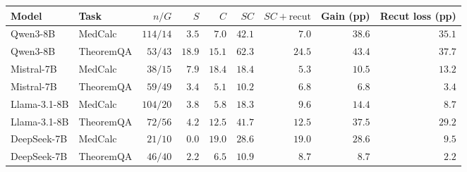 \begin{tabular*}{\textwidth}{@{\extracolsep{\fill}}llrrrrrrr@{}}
\toprule
Model & Task & $n/G$ & $S$ & $C$ & $SC$ & $SC{+}\mathrm{recut}$ & Gain (pp) & Recut loss (pp) \\
\midrule
Qwen3-8B & MedCalc & $114/14$ & $3.5$ & $7.0$ & $42.1$ & $7.0$ & $38.6$ & $35.1$ \\
Qwen3-8B & TheoremQA & $53/43$ & $18.9$ & $15.1$ & $62.3$ & $24.5$ & $43.4$ & $37.7$ \\
Mistral-7B & MedCalc & $38/15$ & $7.9$ & $18.4$ & $18.4$ & $5.3$ & $10.5$ & $13.2$ \\
Mistral-7B & TheoremQA & $59/49$ & $3.4$ & $5.1$ & $10.2$ & $6.8$ & $6.8$ & $3.4$ \\
Llama-3.1-8B & MedCalc & $104/20$ & $3.8$ & $5.8$ & $18.3$ & $9.6$ & $14.4$ & $8.7$ \\
Llama-3.1-8B & TheoremQA & $72/56$ & $4.2$ & $12.5$ & $41.7$ & $12.5$ & $37.5$ & $29.2$ \\
DeepSeek-7B & MedCalc & $21/10$ & $0.0$ & $19.0$ & $28.6$ & $19.0$ & $28.6$ & $9.5$ \\
DeepSeek-7B & TheoremQA & $46/40$ & $2.2$ & $6.5$ & $10.9$ & $8.7$ & $8.7$ & $2.2$ \\
\bottomrule
\end{tabular*}
